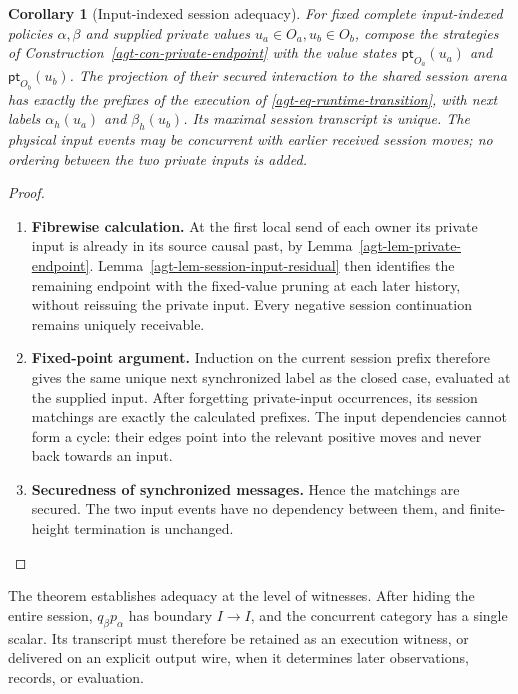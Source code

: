 \documentclass[11pt,a4paper]{article}
\numberwithin{equation}{section}
\newtheorem{corollary}[theorem]{Corollary}
\theoremstyle{definition}
\theoremstyle{remark}
\theoremstyle{plain}
\begin{document}
\begin{corollary}[Input-indexed session adequacy]
\label{agt-cor-session-input}
For fixed complete input-indexed policies $\alpha,\beta$ and supplied
private values $u_a\in O_a,u_b\in O_b$, compose the strategies of
Construction~\ref{agt-con-private-endpoint} with the value states
$\mathsf{pt}_{O_a}(u_a)$ and $\mathsf{pt}_{O_b}(u_b)$.
The projection of their secured interaction to the shared session arena
has exactly the prefixes of the execution of
\eqref{agt-eq-runtime-transition}, with next labels
$\alpha_h(u_a)$ and $\beta_h(u_b)$.  Its maximal session transcript
is unique.  The physical input events may be concurrent with earlier
received session moves; no ordering between the two private inputs is
added.
\end{corollary}
\begin{proof}
\leavevmode
\begin{enumerate}[label=\textup{(\arabic*)},leftmargin=*,itemsep=4pt,topsep=3pt]
  \item \textbf{Fibrewise calculation.} At the first local send of each owner its private input is already in
its source causal past, by Lemma~\ref{agt-lem-private-endpoint}. Lemma~\ref{agt-lem-session-input-residual} then identifies the remaining
endpoint with the fixed-value pruning at each later history, without
reissuing the private input. Every negative session continuation remains
uniquely receivable.
  \item \textbf{Fixed-point argument.} Induction on the current session prefix therefore gives the same unique
next synchronized label as the closed case, evaluated at the supplied
input. After forgetting private-input occurrences, its session matchings
are exactly the calculated prefixes. The input dependencies cannot form
a cycle: their edges point into the relevant positive moves and never
back towards an input.
  \item \textbf{Securedness of synchronized messages.} Hence the matchings are secured. The two input
events have no dependency between them, and finite-height termination
is unchanged.
\end{enumerate}
\end{proof}

The theorem establishes adequacy at the level of witnesses. After hiding
the entire session, $q_\beta p_\alpha$ has boundary $I\to I$, and the
concurrent category has a single scalar. Its transcript must therefore be
retained as an execution witness, or delivered on an explicit output wire,
when it determines later observations, records, or evaluation.
\end{document}
